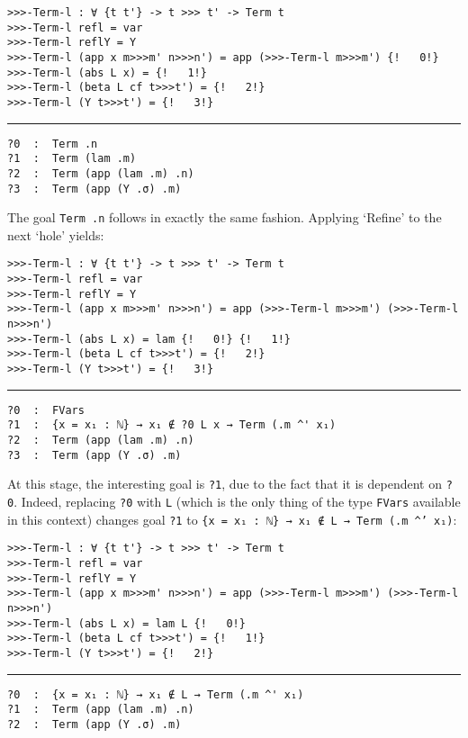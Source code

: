\documentclass[a4paper, 12pt, twoside]{style/ociamthesis}
\theoremstyle{plain}
\theoremstyle{definition}
\theoremstyle{remark}
\begin{document}
\begin{verbatim}
>>>-Term-l : ∀ {t t'} -> t >>> t' -> Term t
>>>-Term-l refl = var
>>>-Term-l reflY = Y
>>>-Term-l (app x m>>>m' n>>>n') = app (>>>-Term-l m>>>m') {!   0!}
>>>-Term-l (abs L x) = {!   1!}
>>>-Term-l (beta L cf t>>>t') = {!   2!}
>>>-Term-l (Y t>>>t') = {!   3!}
\end{verbatim}

\noindent\rule{8cm}{0.4pt}

\begin{verbatim}
?0  :  Term .n
?1  :  Term (lam .m)
?2  :  Term (app (lam .m) .n)
?3  :  Term (app (Y .σ) .m)
\end{verbatim}

The goal \texttt{Term .n} follows in exactly the same fashion. Applying
`Refine' to the next `hole' yields:

\begin{verbatim}
>>>-Term-l : ∀ {t t'} -> t >>> t' -> Term t
>>>-Term-l refl = var
>>>-Term-l reflY = Y
>>>-Term-l (app x m>>>m' n>>>n') = app (>>>-Term-l m>>>m') (>>>-Term-l n>>>n')
>>>-Term-l (abs L x) = lam {!   0!} {!   1!}
>>>-Term-l (beta L cf t>>>t') = {!   2!}
>>>-Term-l (Y t>>>t') = {!   3!}
\end{verbatim}

\noindent\rule{8cm}{0.4pt}

\begin{verbatim}
?0  :  FVars
?1  :  {x = x₁ : ℕ} → x₁ ∉ ?0 L x → Term (.m ^' x₁)
?2  :  Term (app (lam .m) .n)
?3  :  Term (app (Y .σ) .m)
\end{verbatim}

At this stage, the interesting goal is \texttt{?1}, due to the fact that
it is dependent on \texttt{?0}. Indeed, replacing \texttt{?0} with
\texttt{L} (which is the only thing of the type \texttt{FVars} available
in this context) changes goal \texttt{?1} to
\texttt{\{x = x₁ : ℕ\} → x₁ ∉ L → Term (.m \textasciicircum' x₁)}:

\begin{verbatim}
>>>-Term-l : ∀ {t t'} -> t >>> t' -> Term t
>>>-Term-l refl = var
>>>-Term-l reflY = Y
>>>-Term-l (app x m>>>m' n>>>n') = app (>>>-Term-l m>>>m') (>>>-Term-l n>>>n')
>>>-Term-l (abs L x) = lam L {!   0!}
>>>-Term-l (beta L cf t>>>t') = {!   1!}
>>>-Term-l (Y t>>>t') = {!   2!}
\end{verbatim}

\noindent\rule{8cm}{0.4pt}

\begin{verbatim}
?0  :  {x = x₁ : ℕ} → x₁ ∉ L → Term (.m ^' x₁)
?1  :  Term (app (lam .m) .n)
?2  :  Term (app (Y .σ) .m)
\end{verbatim}
\end{document}
